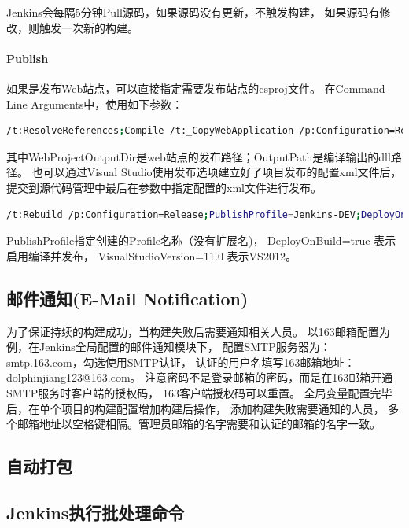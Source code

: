 \documentclass{book}
\begin{document}
Jenkins会每隔5分钟Pull源码，如果源码没有更新，不触发构建，
如果源码有修改，则触发一次新的构建。


\paragraph{Publish}

如果是发布Web站点，可以直接指定需要发布站点的csproj文件。
在Command Line Arguments中，使用如下参数：

\begin{lstlisting}[language=Bash]
/t:ResolveReferences;Compile /t:_CopyWebApplication /p:Configuration=Release /p:WebProjectOutputDir=C:\Jenkins_Publish /p:OutputPath=C:\Jenkins_Publish\bin  
\end{lstlisting}

其中WebProjectOutputDir是web站点的发布路径；OutputPath是编译输出的dll路径。
也可以通过Visual Studio使用发布选项建立好了项目发布的配置xml文件后，
提交到源代码管理中最后在参数中指定配置的xml文件进行发布。

\begin{lstlisting}[language=Bash]
/t:Rebuild /p:Configuration=Release;PublishProfile=Jenkins-DEV;DeployOnBuild=true;VisualStudioVersion=11.0   
\end{lstlisting}

PublishProfile指定创建的Profile名称（没有扩展名)，
DeployOnBuild=true 表示启用编译并发布，
VisualStudioVersion=11.0 表示VS2012。

\subsection{邮件通知(E-Mail Notification)}

为了保证持续的构建成功，当构建失败后需要通知相关人员。
以163邮箱配置为例，在Jenkins全局配置的邮件通知模块下，
配置SMTP服务器为：smtp.163.com，勾选使用SMTP认证，
认证的用户名填写163邮箱地址：dolphinjiang123@163.com。
注意密码不是登录邮箱的密码，而是在163邮箱开通SMTP服务时客户端的授权码，
163客户端授权码可以重置。
全局变量配置完毕后，在单个项目的构建配置增加构建后操作，
添加构建失败需要通知的人员，
多个邮箱地址以空格键相隔。管理员邮箱的名字需要和认证的邮箱的名字一致。

\subsection{自动打包}


\subsection{Jenkins执行批处理命令}
\end{document}

